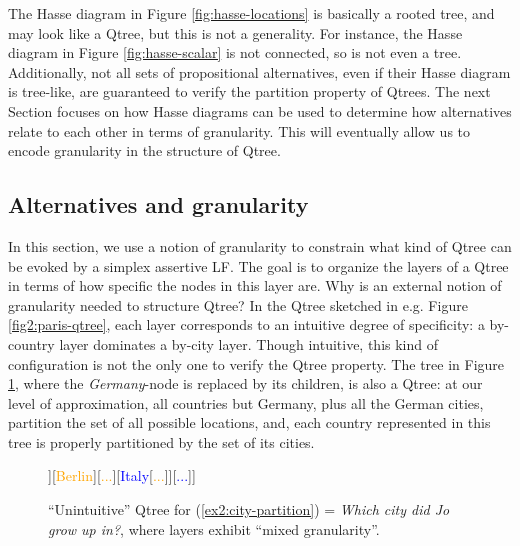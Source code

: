 The Hasse diagram in Figure \ref{fig:hasse-locations} is basically a rooted tree, and may look like a Qtree, but this is not a generality. For instance, the Hasse diagram in Figure \ref{fig:hasse-scalar} is not connected, so is not even a tree. Additionally, not all sets of propositional alternatives, even if their Hasse diagram is tree-like, are guaranteed to verify the partition property of Qtrees. The next Section focuses on how Hasse diagrams can be used to determine how alternatives relate to each other in terms of granularity. This will eventually allow us to encode granularity in the structure of Qtree.



\subsection{Alternatives and granularity}

In this section, we use a notion of granularity to constrain what kind of Qtree can be evoked by a simplex assertive LF. The goal is to organize the layers of a Qtree in terms of how specific the nodes in this layer are. Why is an external notion of granularity needed to structure Qtree? In the Qtree sketched in e.g. Figure \ref{fig2:paris-qtree}, each layer corresponds to an intuitive degree of specificity: a by-country layer dominates a by-city layer. Though intuitive, this kind of configuration is not the only one to verify the Qtree property. The tree in Figure \ref{fig2:paris-qtree-mixed}, where the \textit{Germany}-node is replaced by its children, is also a Qtree: at our level of approximation, all countries but Germany, plus all the German cities, partition the set of all possible locations, and, each country represented in this tree is properly partitioned by the set of its cities.


\begin{figure}[H]
	\centering
		\begin{forest}
			[{CS\\
				Jo grew up in...}[\textcolor{blue}{France}[\textcolor{orange}{{\fbox{Paris}}}][\textcolor{orange}{Lyon}][\textcolor{orange}{...}]][\textcolor{orange}{Berlin}][\textcolor{orange}{...}][\textcolor{blue}{Italy}[\textcolor{orange}{...}]][\textcolor{blue}{...}]]
		\end{forest}
		\caption{``Unintuitive'' Qtree for (\ref{ex2:city-partition}) = \textit{Which city did Jo grow up in?}, where layers exhibit ``mixed granularity''.}\label{fig2:paris-qtree-mixed}
	\end{figure}

